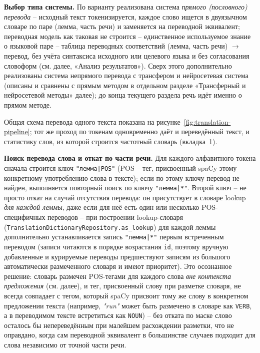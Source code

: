 
\textbf{Выбор типа системы.} По варианту реализована система
\emph{прямого (пословного) перевода} -- исходный текст токенизируется,
каждое слово ищется в двуязычном словаре по паре (лемма, часть речи) и
заменяется на переводной эквивалент; переводная модель как таковая не
строится -- единственное используемое знание о языковой паре -- таблица
переводных соответствий (лемма, часть речи) $\to$ перевод, без учёта
синтаксиса исходного или целевого языка и без согласования словоформ
(см. далее, «Анализ результатов»). Сверх этого дополнительно
реализованы система непрямого перевода с трансфером и нейросетевая
система (описаны и сравнены с прямым методом в отдельном разделе
«Трансферный и нейросетевой методы» далее); до конца текущего раздела
речь идёт именно о прямом методе.

Общая схема перевода одного текста показана на
рисунке~\ref{fig:translation-pipeline}; тот же проход по токенам
одновременно даёт и переведённый текст, и статистику слов, из которой
строится частотный словарь (вкладка~1).


\textbf{Поиск перевода слова и откат по части речи.} Для каждого
алфавитного токена сначала строится ключ \texttt{"лемма|POS"} (POS --
тег, присвоенный spaCy этому конкретному употреблению слова в тексте);
если по этому ключу перевод не найден, выполняется повторный поиск по
ключу \texttt{"лемма|*"}. Второй ключ -- не просто откат на случай
отсутствия перевода: он присутствует в словаре lookup \emph{для каждой
леммы}, даже если для неё есть один или несколько
POS-специфичных переводов -- при построении lookup-словаря
(\texttt{TranslationDictionaryRepository.as\_lookup}) для каждой леммы
дополнительно устанавливается запись \texttt{"лемма|*"} первым
встреченным переводом (записи читаются в порядке возрастания
\texttt{id}, поэтому вручную добавленные и курируемые переводы
предшествуют записям из большого автоматически размеченного словаря и
имеют приоритет). Это осознанное решение: словарь размечен POS-тегами
для каждого слова \emph{вне контекста предложения} (см. далее), и тег,
присвоенный слову при разметке словаря, не всегда совпадает с тегом,
который spaCy присвоит тому же слову в конкретном предложении текста
(например, \emph{"run"} может быть размечено в словаре как
\texttt{VERB}, а в переводимом тексте встретиться как
\texttt{NOUN}) -- без отката по маске слово осталось бы непереведённым
при малейшем расхождении разметки, что не оправдано, когда сам
переводной эквивалент в большинстве случаев подходит для слова
независимо от точной части речи.

